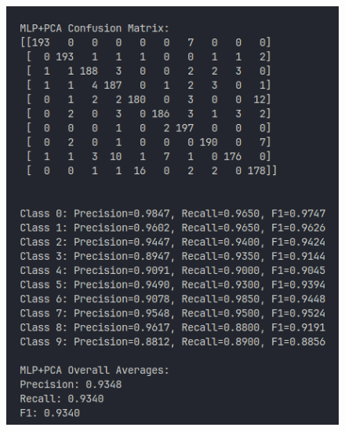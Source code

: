 \documentclass{article}
\begin{document}
\begin{itemize}
\begin{figure}[h]
    \begin{minipage}{0.45\textwidth}
        \centering
        \includegraphics[width=\linewidth]{3.png}
    \end{minipage}
    \hfill
    \begin{minipage}{0.45\textwidth}
        \centering

\end{minipage}
\end{figure}
\end{itemize}
\end{document}
